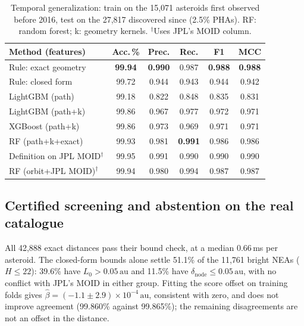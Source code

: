 \documentclass[make,article,submit,moreauthors]{Definitions/mdpi}
\newcommand{\au}{\,\mathrm{au}}
\begin{document}
\begin{table}[t]
\centering
\footnotesize
\caption{Temporal generalization: train on the 15,071 asteroids first observed before 2016, test on the 27,817 discovered since (2.5\% PHAs). RF: random forest; k: geometry kernels. $^\dagger$Uses JPL's MOID column.}
\label{tab:temporal}
\setlength{\tabcolsep}{2pt}
\begin{tabular}{@{}lccccc@{}}
\toprule
Method (features) & Acc.\,\% & Prec. & Rec. & F1 & MCC \\
\midrule
Rule: exact geometry & \textbf{99.94} & \textbf{0.990} & 0.987 & \textbf{0.988} & \textbf{0.988} \\
Rule: closed form & 99.72 & 0.944 & 0.943 & 0.944 & 0.942 \\
LightGBM (path) & 99.18 & 0.822 & 0.848 & 0.835 & 0.831 \\
LightGBM (path+k) & 99.86 & 0.967 & 0.977 & 0.972 & 0.971 \\
XGBoost (path+k) & 99.86 & 0.973 & 0.969 & 0.971 & 0.971 \\
RF (path+k+exact) & 99.93 & 0.981 & \textbf{0.991} & 0.986 & 0.986 \\
\midrule
Definition on JPL MOID$^\dagger$ & 99.95 & 0.991 & 0.990 & 0.990 & 0.990 \\
RF (orbit+JPL MOID)$^\dagger$ & 99.94 & 0.980 & 0.994 & 0.987 & 0.987 \\
\bottomrule
\end{tabular}
\end{table}


\subsection{Certified screening and abstention on the real catalogue}
All 42,888 exact distances pass their bound check, at a median 0.66\,ms per asteroid. The closed-form bounds alone settle 51.1\% of the 11,761 bright NEAs ($H \le 22$): 39.6\% have $L_0 > 0.05\au$ and 11.5\% have $\delta_{\mathrm{node}} \le 0.05\au$, with no conflict with JPL's MOID in either group. Fitting the score offset on training folds gives $\hat\beta = (-1.1 \pm 2.9)\times10^{-4}\au$, consistent with zero, and does not improve agreement (99.860\% against 99.865\%); the remaining disagreements are not an offset in the distance.
\end{document}
